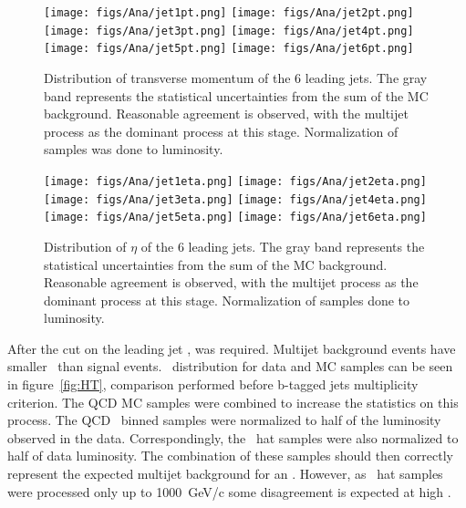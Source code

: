 \begin{figure}[!Hhtbp]
  \begin{center}
    \texttt{[image: figs/Ana/jet1pt.png]}
    \texttt{[image: figs/Ana/jet2pt.png]}
    \texttt{[image: figs/Ana/jet3pt.png]}
    \texttt{[image: figs/Ana/jet4pt.png]}
    \texttt{[image: figs/Ana/jet5pt.png]}
    \texttt{[image: figs/Ana/jet6pt.png]}
    \caption{Distribution of transverse momentum of the 6 leading jets. The gray band represents the statistical uncertainties from the sum of the MC background. Reasonable agreement is observed, with the multijet process as the dominant process at this stage. Normalization of samples was done to luminosity.}
    \label{fig:6jpt}
  \end{center}
\end{figure}

\begin{figure}[!Hhtbp]
  \begin{center}
    \texttt{[image: figs/Ana/jet1eta.png]}
    \texttt{[image: figs/Ana/jet2eta.png]}
    \texttt{[image: figs/Ana/jet3eta.png]}
    \texttt{[image: figs/Ana/jet4eta.png]}
    \texttt{[image: figs/Ana/jet5eta.png]}
    \texttt{[image: figs/Ana/jet6eta.png]}
    \caption{Distribution of $\eta$ of the 6 leading jets. The gray band represents the statistical uncertainties from the sum of the MC background. Reasonable agreement is observed, with the multijet process as the dominant process at this stage. Normalization of samples done to luminosity.}
    \label{fig:6jeta}
  \end{center}
\end{figure}

After the cut on the leading jet \pt,  was required. Multijet background events have smaller \HT~than signal events. \HT~distribution for data and MC samples can be seen in figure~\ref{fig:HT}, comparison performed before b-tagged jets multiplicity criterion. The QCD MC samples were combined to increase the statistics on this process. The QCD \HT~binned samples were normalized to half of the luminosity observed in the data. Correspondingly, the \pt~hat samples were also normalized to half of data luminosity. The combination of these samples should then correctly represent the expected multijet background for an . However, as \pt~hat samples were processed only up to 1000~GeV/c some disagreement is expected at high \HT.

